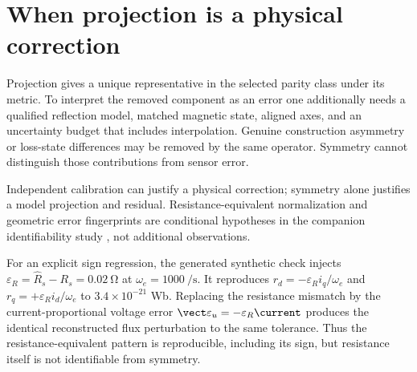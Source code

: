 \section{When projection is a physical correction}
Projection gives a unique representative in the selected parity class under
its metric. To interpret the removed component as an error one additionally
needs a qualified reflection model, matched magnetic state, aligned axes,
and an uncertainty budget that includes interpolation. Genuine construction
asymmetry or loss-state differences may be removed by the same operator.
Symmetry cannot distinguish those contributions from sensor error.

Independent calibration can justify a physical correction; symmetry alone
justifies a model projection and residual. Resistance-equivalent normalization
and geometric error fingerprints are conditional hypotheses in the companion
identifiability study \cite{companion-diagnostics}, not additional observations.

For an explicit sign regression, the generated synthetic check injects
$\varepsilon_R=\hat R_s-R_s=\SI{0.02}{\ohm}$ at
$\omega_e=\SI{1000}{\per\second}$. It reproduces
$r_d=-\varepsilon_R i_q/\omega_e$ and
$r_q=+\varepsilon_R i_d/\omega_e$ to $3.4\times10^{-21}$ Wb. Replacing the
resistance mismatch by the current-proportional voltage error
$\vect\varepsilon_u=-\varepsilon_R\current$ produces the identical reconstructed
flux perturbation to the same tolerance. Thus the resistance-equivalent pattern
is reproducible, including its sign, but resistance itself is not identifiable
from symmetry.
